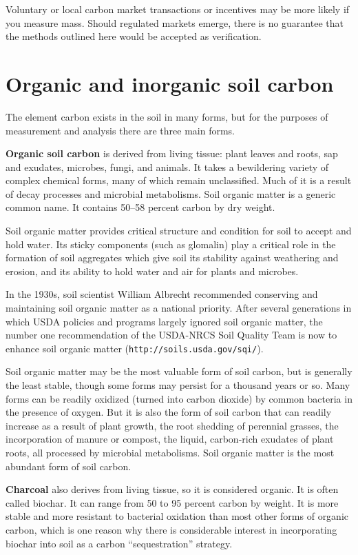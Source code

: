 \documentclass[11pt,letterpaper,oneside,onecolumn]{memoir}
\begin{document}
Voluntary or local carbon market transactions or incentives may be more likely if you measure mass. Should regulated markets emerge, there is no guarantee that the methods outlined here would be accepted as verification.

\section{Organic and inorganic soil carbon}

The element carbon exists in the soil in many forms, but for the purposes of measurement and analysis there are three main forms.

\textbf{Organic soil carbon} is derived from living tissue: plant leaves and roots, sap and exudates, microbes, fungi, and animals. It takes a bewildering variety of complex chemical forms, many of which remain unclassified. Much of it is a result of decay processes and microbial metabolisms. Soil organic matter is a generic common name. It contains 50--58 percent carbon by dry weight.

Soil organic matter provides critical structure and condition for soil to accept and hold water. Its sticky components (such as glomalin) play a critical role in the formation of soil aggregates which give soil its stability against weathering and erosion, and its ability to hold water and air for plants and microbes.

In the 1930s, soil scientist William Albrecht recommended conserving and maintaining soil organic matter as a national priority. After several generations in which USDA policies and programs largely ignored soil organic matter, the number one recommendation of the USDA-NRCS Soil Quality Team is now to enhance soil organic matter (\texttt{http://soils.usda.gov/sqi/}).

Soil organic matter may be the most valuable form of soil carbon, but is generally the least stable, though some forms may persist for a thousand years or so. Many forms can be readily oxidized (turned into carbon dioxide) by common bacteria in the presence of oxygen. But it is also the form of soil carbon that can readily increase as a result of plant growth, the root shedding of perennial grasses, the incorporation of manure or compost, the liquid, carbon-rich exudates of plant roots, all processed by microbial metabolisms. Soil organic matter is the most abundant form of soil carbon.

\textbf{Charcoal} also derives from living tissue, so it is considered organic. It is often called biochar. It can range from 50 to 95 percent carbon by weight. It is more stable and more resistant to bacterial oxidation than most other forms of organic carbon, which is one reason why there is considerable interest in incorporating biochar into soil as a carbon ``sequestration'' strategy.
\end{document}
